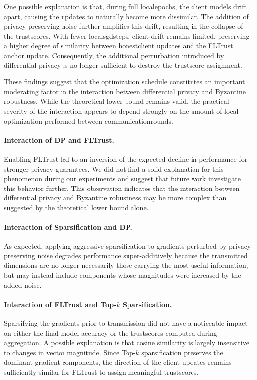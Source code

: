 \documentclass[11pt,twocolumn,a4paper,DIV=calc,parskip=half]{scrartcl}
\begin{document}
	One possible explanation is that, during full \glspl{localepoch}, the client models drift apart, causing the updates to naturally become more dissimilar. The addition of privacy-preserving noise further amplifies this drift, resulting in the collapse of the \glspl{trustscore}. With fewer \glspl{localsgdstep}, client drift remains limited, preserving a higher degree of similarity between \gls{honestclient} updates and the FLTrust anchor update. Consequently, the additional perturbation introduced by differential privacy is no longer sufficient to destroy the \gls{trustscore} assignment.
	
	These findings suggest that the optimization schedule constitutes an important moderating factor in the interaction between differential privacy and Byzantine robustness. While the theoretical lower bound remains valid, the practical severity of the interaction appears to depend strongly on the amount of local optimization performed between \glspl{communicationround}.
	
	\paragraph{Interaction of \ac{DP} and FLTrust.}
	Enabling FLTrust led to an inversion of the expected decline in performance for stronger privacy guarantees. We did not find a solid explanation for this phenomenon during our experiments and suggest that future work investigate this behavior further. This observation indicates that the interaction between differential privacy and Byzantine robustness may be more complex than suggested by the theoretical lower bound alone.
	
	\paragraph{Interaction of Sparsification and \ac{DP}.}
	As expected, applying aggressive sparsification to gradients perturbed by privacy-preserving noise degrades performance super-additively because the transmitted dimensions are no longer necessarily those carrying the most useful information, but may instead include components whose magnitudes were increased by the added noise.
	
	\paragraph{Interaction of FLTrust and Top-$k$ Sparsification.}
	Sparsifying the gradients prior to transmission did not have a noticeable impact on either the final model accuracy or the \glspl{trustscore} computed during aggregation. A possible explanation is that cosine similarity is largely insensitive to changes in vector magnitude. Since Top-$k$ sparsification preserves the dominant gradient components, the direction of the client updates remains sufficiently similar for FLTrust to assign meaningful \glspl{trustscore}.
	
\end{document}
